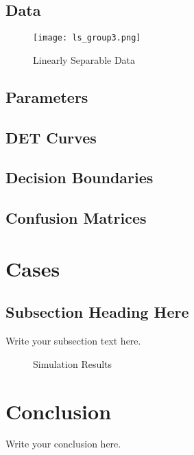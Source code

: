 \documentclass[11pt,a4paper]{article}
\begin{document}
\subsection{Data}
\begin{figure}[h!]
\texttt{[image: ls\_group3.png]}
\caption{Linearly Separable Data}
\end{figure}

\subsection{Parameters}
\subsection{DET Curves}
\subsection{Decision Boundaries}
\subsection{Confusion Matrices}

\section{Cases}
\subsection{Subsection Heading Here}
Write your subsection text here.

\begin{figure}
    \centering
    \caption{Simulation Results}
    \label{simulationfigure}
\end{figure}

\section{Conclusion}
Write your conclusion here.
\end{document}
